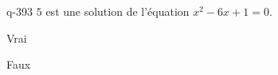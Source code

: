 \begin{truefalse}{q-393}
$5$ est une solution de l'équation $x^2-6x+1=0$.
\item Vrai
\item* Faux
\end{truefalse}

